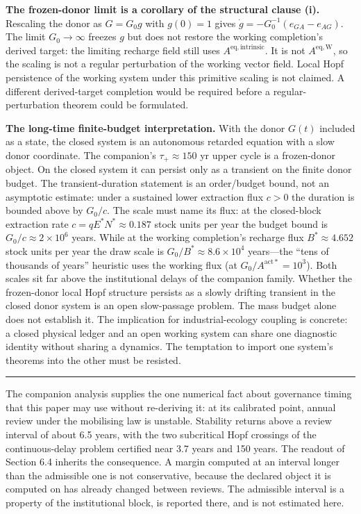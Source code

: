 \documentclass[11pt]{article}
\begin{document}
\textbf{The frozen-donor limit is a corollary of the structural clause
(i).} Rescaling the donor as \(G = G_0 g\) with \(g(0) = 1\) gives \(\dot g = -G_0^{-1}(e_{GA} - e_{AG})\). The limit \(G_0 \to \infty\) freezes \(g\) but does not restore the working completion's derived target: the limiting recharge field still uses \(A^{\mathrm{eq,intrinsic}}\). It is not \(A^{\mathrm{eq,W}}\), so the scaling is not a regular perturbation of the working vector field. Local Hopf persistence of the working system under this primitive scaling is not claimed. A different derived-target completion would be required before a regular-perturbation theorem could be formulated.

\textbf{The long-time finite-budget interpretation.} With the donor \(G(t)\) included as a state, the closed system is an autonomous retarded equation with a slow donor coordinate. The companion's \(\tau_+ \approx 150\) yr upper cycle is a frozen-donor object. On the closed system it can persist only as a transient on the finite donor budget. The transient-duration statement is an order/\allowbreak{}budget bound, not an asymptotic estimate: under a sustained lower extraction flux \(c > 0\) the duration is bounded above by \(G_0/\allowbreak{}c\). The scale must name its flux: at the closed-block extraction rate \(c = qE^*N^* \approx 0.187\) stock units per year the budget bound is \(G_0/\allowbreak{}c \approx 2 \times 10^6\) years. While at the working completion's recharge flux \(B^* \approx 4.652\) stock units per year the draw scale is \(G_0/\allowbreak{}B^* \approx 8.6 \times 10^4\) years---the ``tens of thousands of years'' heuristic uses the working flux (at \(G_0/\allowbreak{}A^{\mathrm{act}*} = 10^3\)). Both scales sit far above the institutional delays of the companion family. Whether the frozen-donor local Hopf structure persists as a slowly drifting transient in the closed donor system is an open slow-passage problem. The mass budget alone does not establish it. The implication for industrial-ecology coupling is concrete: a closed physical ledger and an open working system can share one diagnostic identity without sharing a dynamics. The temptation to import one system's theorems into the other must be resisted.

\begin{center}\rule{0.5\linewidth}{0.5pt}\end{center}

The companion analysis supplies the one numerical fact about governance timing that this paper may use without re-deriving it: at its calibrated point, annual review under the mobilising law is unstable. Stability returns above a review interval of about 6.5 years, with the two subcritical Hopf crossings of the continuous-delay problem certified near 3.7 years and 150 years. The readout of Section 6.4 inherits the consequence. A margin computed at an interval longer than the admissible one is not conservative, because the declared object it is computed on has already changed between reviews. The admissible interval is a property of the institutional block, is reported there, and is not estimated here.
\end{document}
